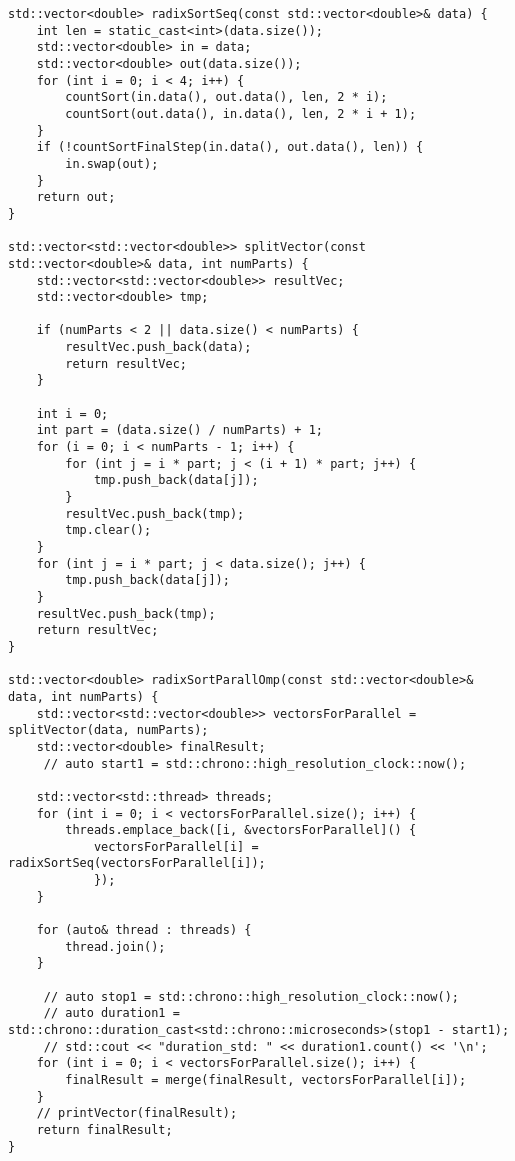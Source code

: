 \documentclass{article}
\begin{document}
\begin{verbatim}
std::vector<double> radixSortSeq(const std::vector<double>& data) {
    int len = static_cast<int>(data.size());
    std::vector<double> in = data;
    std::vector<double> out(data.size());
    for (int i = 0; i < 4; i++) {
        countSort(in.data(), out.data(), len, 2 * i);
        countSort(out.data(), in.data(), len, 2 * i + 1);
    }
    if (!countSortFinalStep(in.data(), out.data(), len)) {
        in.swap(out);
    }
    return out;
}

std::vector<std::vector<double>> splitVector(const std::vector<double>& data, int numParts) {
    std::vector<std::vector<double>> resultVec;
    std::vector<double> tmp;

    if (numParts < 2 || data.size() < numParts) {
        resultVec.push_back(data);
        return resultVec;
    }

    int i = 0;
    int part = (data.size() / numParts) + 1;
    for (i = 0; i < numParts - 1; i++) {
        for (int j = i * part; j < (i + 1) * part; j++) {
            tmp.push_back(data[j]);
        }
        resultVec.push_back(tmp);
        tmp.clear();
    }
    for (int j = i * part; j < data.size(); j++) {
        tmp.push_back(data[j]);
    }
    resultVec.push_back(tmp);
    return resultVec;
}

std::vector<double> radixSortParallOmp(const std::vector<double>& data, int numParts) {
    std::vector<std::vector<double>> vectorsForParallel = splitVector(data, numParts);
    std::vector<double> finalResult;
     // auto start1 = std::chrono::high_resolution_clock::now();

    std::vector<std::thread> threads;
    for (int i = 0; i < vectorsForParallel.size(); i++) {
        threads.emplace_back([i, &vectorsForParallel]() {
            vectorsForParallel[i] = radixSortSeq(vectorsForParallel[i]);
            });
    }

    for (auto& thread : threads) {
        thread.join();
    }

     // auto stop1 = std::chrono::high_resolution_clock::now();
     // auto duration1 = std::chrono::duration_cast<std::chrono::microseconds>(stop1 - start1);
     // std::cout << "duration_std: " << duration1.count() << '\n';
    for (int i = 0; i < vectorsForParallel.size(); i++) {
        finalResult = merge(finalResult, vectorsForParallel[i]);
    }
    // printVector(finalResult);
    return finalResult;
}
\end{verbatim}
\end{document}
